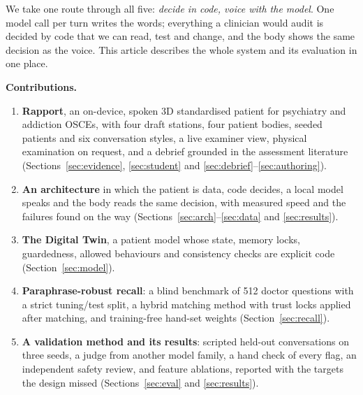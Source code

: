 \documentclass[journal]{IEEEtran}
\begin{document}
We take one route through all five: \emph{decide in code, voice with the model}. One model call per turn writes the words; everything a
clinician would audit is decided by code that we can read, test and change, and the body shows the same decision as the voice. This article
describes the whole system and its evaluation in one place.

\textbf{Contributions.}
\begin{enumerate}
\item \textbf{Rapport}, an on-device, spoken 3D standardised patient for psychiatry and addiction OSCEs, with four draft stations, four patient
bodies, seeded patients and six conversation styles, a live examiner view, physical examination on request, and a debrief grounded in the
assessment literature (Sections~\ref{sec:evidence}, \ref{sec:student} and \ref{sec:debrief}--\ref{sec:authoring}).
\item \textbf{An architecture} in which the patient is data, code decides, a local model speaks and the body reads the same decision, with
measured speed and the failures found on the way (Sections~\ref{sec:arch}--\ref{sec:data} and \ref{sec:results}).
\item \textbf{The Digital Twin}, a patient model whose state, memory locks, guardedness, allowed behaviours and consistency checks are explicit
code (Section~\ref{sec:model}).
\item \textbf{Paraphrase-robust recall}: a blind benchmark of 512 doctor questions with a strict tuning/test split, a hybrid matching method with
trust locks applied after matching, and training-free hand-set weights (Section~\ref{sec:recall}).
\item \textbf{A validation method and its results}: scripted held-out conversations on three seeds, a judge from another model family, a hand
check of every flag, an independent safety review, and feature ablations, reported with the targets the design missed
(Sections~\ref{sec:eval} and \ref{sec:results}).
\end{enumerate}
\end{document}
